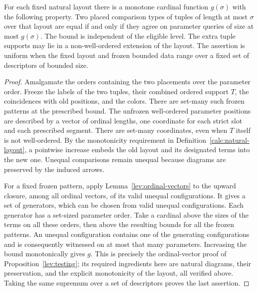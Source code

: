 \begin{proposition}
\label{calc:testing}
\label{calc:layout-testing}
For each fixed natural layout there is a monotone cardinal function
$g(\sigma)$ with the following property.  Two placed comparison types of
tuples of length at most $\sigma$ over that layout are equal if and only
if they agree on parameter queries of size at most $g(\sigma)$.
The bound is independent of the eligible level.  The extra tuple supports
may lie in a non-well-ordered extension of the layout.  The assertion is
uniform when the fixed layout and frozen bounded data range over a fixed
set of descriptors of bounded size.
\end{proposition}

\begin{proof}
Amalgamate the orders containing the two placements over the parameter
order.  Freeze the labels of the two tuples, their combined ordered
support $T$, the coincidences with old positions, and the colors.  There
are set-many such frozen patterns at the prescribed bound.  The
unfrozen well-ordered parameter positions are described by a vector of
ordinal lengths, one coordinate for each strict slot and each prescribed
segment.  There are set-many coordinates, even when $T$ itself is not
well-ordered.  By the monotonicity requirement in
Definition~\ref{calc:natural-layout}, a pointwise increase embeds the old
layout and its designated terms into the new one.  Unequal comparisons
remain unequal because diagrams are preserved by the induced arrows.

For a fixed frozen pattern, apply
Lemma~\ref{lev:ordinal-vectors} to the upward closure, among all ordinal
vectors, of its valid unequal configurations.  It gives a set of
generators, which can be chosen from valid unequal configurations.  Each
generator has a set-sized parameter order.  Take a cardinal above the
sizes of the terms on all these orders, then above the resulting bounds
for all the frozen patterns.  An unequal configuration contains one of
the generating configurations and is consequently witnessed on at most
that many parameters.  Increasing the bound monotonically gives $g$.
This is precisely the ordinal-vector proof of
Proposition~\ref{lev:testing}; its required ingredients here are natural
diagrams, their preservation, and the explicit monotonicity of the
layout, all verified above.  Taking the same supremum over a set of
descriptors proves the last assertion.
\end{proof}

